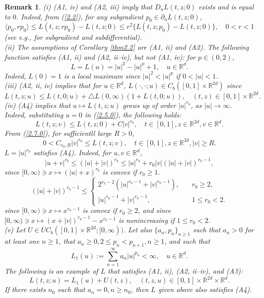 \documentclass[12pt]{article}
\newtheorem{remark}{Remark}[section]
\begin{document}
\begin{remark}\label{rk2.1}
(i) (A1, iv) and (A2, iii) imply that $D_uL (t,z;0)$ exists and is equal to $0$.
Indeed, from (\ref{2.2}), for any subgradient $p_0\in \partial_u L (t,z;0)$, 
$$\langle p_0,rp_0\rangle \le L (t,z;rp_0)-L (t,z;0)\le r^2 \{L (t,z;p_0)-L (t,z;0)\},\quad 0<r<1$$
(see e.g., \cite{1-V2} for subgradient and subdifferential).\\
(ii) The assumptions of Corollary \ref{thm2.2}
 are (A1, ii) and  (A2).
The following function satisfies (A1, ii)  and (A2, ii--iv), but not  (A1, iv): for $p\in (0,2)$, 
$$L=L(u)=|u|^2-|u|^p+1,\quad u\in  \mathbb{R}^d.$$
Indeed, $L (0)=1$ is a local maximum since $|u|^2<|u|^p$ if $0<|u|<1$.\\
(iii) (A2, ii, iv) implies that for $u\in \mathbb{R}^{d}$, $L (\cdot,\cdot;u)\in C_b ([0,1]\times\mathbb{R}^{2d})$
since 
$$L (t,z;u)\le L (t,0;u)+\triangle L(0,\infty)(1+L (t,0;u)),\quad (t, z)\in [0,1]\times \mathbb{R}^{2d}.$$
(iv) (A4) implies that $u\mapsto L(t,z;u)$ grows up of order $|u|^{r_0}$, as $|u|\to\infty$.
Indeed, substituting $u=0$ in (\ref{2.5.0}), the following holds:
$$
L(t,z;v)\le L(t,z;0)+C|v|^{r_0}, \quad  t\in [0,1], z\in \mathbb{R}^{2d},v \in \mathbb{R}^d.
$$
From (\ref{2.7.0}), for sufficientll large $R>0$,
$$0<C_{r_0,R}|v|^{r_0}\le L(t,z;v),\quad  t\in [0,1], z\in \mathbb{R}^{2d},
|v|\ge R.$$
$L=|u|^{r_0}$ satisfies (A4). Indeed, for $u,v \in \mathbb{R}^d$,
$$
|u+v|^{r_0}\le (|u|+|v|)^{r_0}\le  |u|^{r_0}+r_0|v|(|u|+|v|)^{r_0-1},
$$
since $[0,\infty)\ni x\mapsto (|u|+x)^{r_0}$ is convex if $r_0\ge 1$.
$$(|u|+|v|)^{r_0-1}\le 
\begin{cases}
2^{r_0-2}(|u|^{r_0-1}+|v|^{r_0-1}),&\quad r_0\ge 2,\\
|u|^{r_0-1}+|v|^{r_0-1},&\quad 1\le r_0<2.
\end{cases}
$$
since $[0,\infty)\ni x\mapsto x^{r_0-1}$ is convex if $r_0\ge 2$,
and since $[0,\infty)\ni x\mapsto (x+|v|)^{r_0-1}-x^{r_0-1}$ is nonincreasing if $1\le r_0<2$.\\
(v) Let $U\in UC_b ([0,1]\times \mathbb{R}^{2d};[0,\infty))$.
Let also $\{a_n,p_n\}_{n\ge 1}$ 
such that $a_n>0$ for at least one $n\ge 1$, that $a_n\ge 0, 2\le p_n<p_{n+1},  n\ge 1$, and such that 
 $$L_1(u):=\sum_{n=1}^\infty a_n |u|^{p_n}<\infty, \quad u\in\mathbb{R}^d.$$
The following is an example of $L$ that satisfies (A1, ii), (A2, ii--iv), and (A3): 
$$L (t,z;u)=L_1(u)+U(t,z),\quad (t, z,u)\in  [0,1]\times  \mathbb{R}^{2d}\times\mathbb{R}^d.$$
If there exists $n_0$ such that $a_n=0, n\ge n_0$, then
$L$ given above also satisfies  (A4).
\end{remark}
\end{document}
